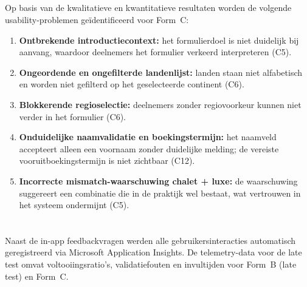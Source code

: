 \subsection{}

Op basis van de kwalitatieve en kwantitatieve resultaten worden de volgende usability-problemen geïdentificeerd voor Form~C:

\begin{enumerate}
  \item \textbf{Ontbrekende introductiecontext:} het formulierdoel is niet duidelijk bij aanvang, waardoor deelnemers het formulier verkeerd interpreteren (C5).
  \item \textbf{Ongeordende en ongefilterde landenlijst:} landen staan niet alfabetisch en worden niet gefilterd op het geselecteerde continent (C6).
  \item \textbf{Blokkerende regioselectie:} deelnemers zonder regiovoorkeur kunnen niet verder in het formulier (C6).
  \item \textbf{Onduidelijke naamvalidatie en boekingstermijn:} het naamveld accepteert alleen een voornaam zonder duidelijke melding; de vereiste vooruitboekingstermijn is niet zichtbaar (C12).
  \item \textbf{Incorrecte mismatch-waarschuwing chalet + luxe:} de waarschuwing suggereert een combinatie die in de praktijk wel bestaat, wat vertrouwen in het systeem ondermijnt (C5).
\end{enumerate}

\section{}

Naast de in-app feedbackvragen werden alle gebruikersinteracties automatisch geregistreerd via Microsoft Application Insights. De telemetry-data voor de late test omvat voltooiingsratio's, validatiefouten en invultijden voor Form~B (late test) en Form~C.

\subsection{}


